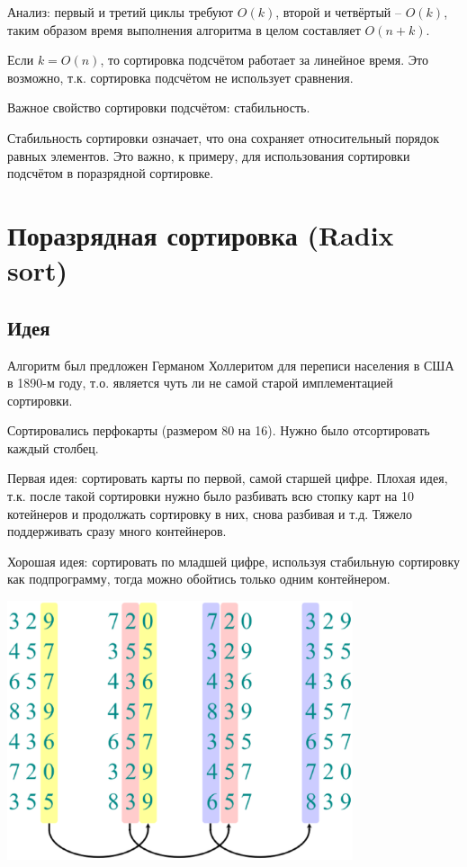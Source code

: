 \documentclass[a4paper,11pt]{article}
\begin{document}
Анализ: первый и третий циклы требуют $O(k)$, второй и четвёртый --
$O(k)$, таким образом время выполнения алгоритма в целом составляет
$O(n+k)$.

Если $k = O(n)$, то сортировка подсчётом работает за линейное время.
Это возможно, т.к. сортировка подсчётом не использует сравнения.

Важное свойство сортировки подсчётом: стабильность.

Стабильность сортировки означает, что она сохраняет относительный порядок равных
элементов. Это важно, к примеру, для использования сортировки подсчётом в
поразрядной сортировке.

\section{Поразрядная сортировка (Radix sort)}

\subsection{Идея}
Алгоритм был предложен Германом Холлеритом для переписи населения в США в 
1890-м году, т.о. является чуть ли не самой старой имплементацией сортировки.

Сортировались перфокарты (размером 80 на 16). Нужно было отсортировать каждый
столбец.

Первая идея: сортировать карты по первой, самой старшей цифре. Плохая идея, т.к.
после такой сортировки нужно было разбивать всю стопку карт на 10 котейнеров и
продолжать сортировку в них, снова разбивая и т.д. Тяжело поддерживать сразу
много контейнеров.

Хорошая идея: сортировать по младшей цифре, используя стабильную сортировку как
подпрограмму, тогда можно обойтись только одним контейнером.

\includegraphics[width=4in]{lecture5/radix-example.eps}
\end{document}

